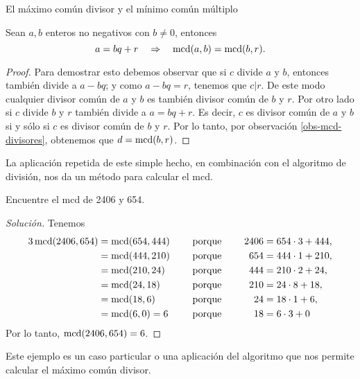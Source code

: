 \begin{section}{El máximo común divisor y el mínimo común múltiplo}
\begin{proposicion}\label{prop-alg-eucl} Sean  $a,b$ enteros no negativos con $b \not=0$, entonces 
    \begin{equation}\label{bec}
    a=bq+r\quad \Rightarrow \quad\operatorname{mcd}(a,b)=\operatorname{mcd}(b,r).
    \end{equation}
\end{proposicion}
\begin{proof}
    Para demostrar esto debemos observar que si $c$ divide $a$ y $b$, entonces también divide a $a-bq$; y como $a-bq=r$, tenemos que $c|r$. De este modo cualquier divisor común de $a$ y $b$ es también divisor común de $b$ y $r$.  Por otro lado si $c$ divide $b$ y $r$ también divide a $a=bq+r$. Es decir, $c$ es divisor común de $a$ y $b$ si y sólo si $c$ es divisor común de $b$ y $r$. Por lo tanto, por observación \ref{obs-mcd-divisores}, obtenemos que $d = \operatorname{mcd}(b,r)$.
\end{proof}

La aplicación repetida de este simple hecho, en combinación con el algoritmo de división, nos da un método para calcular el mcd.

\begin{ejemplo*} Encuentre el mcd de 2406 y 654.
\end{ejemplo*}
\begin{proof}[Solución] Tenemos
    \begin{alignat*}3
    \mcd(2406,654)&=\mcd(654,444)&\quad &\text{ porque }\quad& 2406&=654\cdot3+444,\\
    &=\mcd(444,210)& &\text{ porque }\quad& 654&=444\cdot1+210,\\
    &=\mcd(210,24)&& \text{ porque }\quad &444&=210\cdot2+24,\\
    &=\mcd(24,18) && \text{ porque }\quad &210&=24\cdot8+18,\\
    &=\mcd(18,6)  && \text{ porque }\quad &24 &=18\cdot1+6,\\
    & =\mcd(6,0) = 6           &&\text{ porque }\quad&18&=6\cdot3 + 0
    \end{alignat*}
    Por lo tanto, $\operatorname{mcd}(2406,654) = 6$.
\end{proof}

Este ejemplo es un caso particular o una aplicación del algoritmo que nos permite calcular el máximo común divisor.


\end{section}
